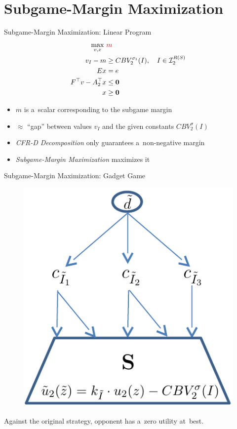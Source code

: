 \documentclass{beamer}
\newcommand{\vect}[1]{\boldsymbol{#1}}
\newcommand{\I}{\mathcal{I}}
\begin{document}
  \section{Subgame-Margin Maximization}
  \begin{frame}{Subgame-Margin Maximization: Linear Program}
    \begin{equation*}
      \label{lp:max-margin}
      \begin{split}
        \max_{v, x}\ &\textcolor{red}{m} \\
        v_I - m &\ge CBV_2^{\sigma_1}(I), \quad I \in \I_2^{R(S)}\\ 
        Ex &= e \\
        F^\top v - A_2^\top x &\le \vect{0} \\
        x &\ge \vect{0}
      \end{split}
    \end{equation*}
    \pause

    \begin{itemize}[<+- | alert@+>]
      \item $m$ is a~scalar corresponding to the subgame margin
      \item $\approx$ ``gap'' between values $v_I$ and the given constants $CBV_2^\sigma(I)$
      \item \emph{CFR-D Decomposition} only guarantees a~non-negative margin
      \item \emph{Subgame-Margin Maximization} maximizes it
    \end{itemize}
  \end{frame}

  \begin{frame}{Subgame-Margin Maximization: Gadget Game}
    \begin{figure}
      \centering
      \includegraphics[width=.5\textwidth]{../img/max-margin-gadget.png}
    \end{figure}
    \pause

    Against the original strategy, opponent has a~zero utility at~best.
  \end{frame}
\end{document}
